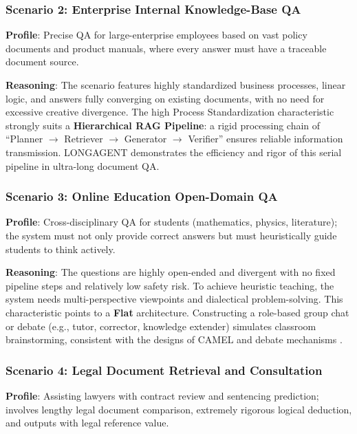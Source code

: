 \subsubsection{Scenario 2: Enterprise Internal Knowledge-Base QA}

\textbf{Profile}: Precise QA for large-enterprise employees based on vast
policy documents and product manuals, where every answer must have a
traceable document source.

\textbf{Reasoning}: The scenario features highly standardized business
processes, linear logic, and answers fully converging on existing
documents, with no need for excessive creative divergence.
The high Process Standardization characteristic strongly suits a
\textbf{Hierarchical RAG Pipeline}: a rigid processing chain of
``Planner $\to$ Retriever $\to$ Generator $\to$ Verifier'' ensures reliable
information transmission.
LONGAGENT \citep{zhao2024longagent} demonstrates the efficiency and
rigor of this serial pipeline in ultra-long document QA.

\subsubsection{Scenario 3: Online Education Open-Domain QA}

\textbf{Profile}: Cross-disciplinary QA for students (mathematics, physics,
literature); the system must not only provide correct answers but must
heuristically guide students to think actively.

\textbf{Reasoning}: The questions are highly open-ended and divergent with
no fixed pipeline steps and relatively low safety risk.
To achieve heuristic teaching, the system needs multi-perspective viewpoints
and dialectical problem-solving.
This characteristic points to a \textbf{Flat} architecture.
Constructing a role-based group chat or debate (e.g., tutor, corrector,
knowledge extender) simulates classroom brainstorming, consistent with the
designs of CAMEL \citep{li2023camel} and debate mechanisms
\citep{du2024multiagent_debate}.

\subsubsection{Scenario 4: Legal Document Retrieval and Consultation}

\textbf{Profile}: Assisting lawyers with contract review and sentencing
prediction; involves lengthy legal document comparison, extremely rigorous
logical deduction, and outputs with legal reference value.

